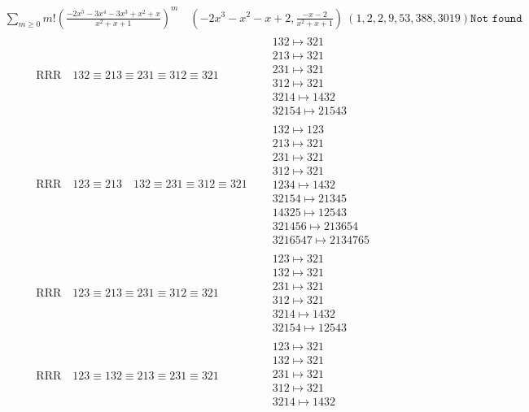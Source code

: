 \documentclass{article}
\begin{document}
$$
\begin{matrix}
\sum_{m \geq 0} m! \left(
\frac{-2 x^{5} - 3 x^{4} - 3 x^{3} + x^{2} + x}{x^{2} + x + 1}
\right)^m
\quad
\left(-2 x^{3} - x^{2} - x + 2, \frac{-x - 2}{x^{2} + x + 1}\right)
\ 
\left(1, 2, 2, 9, 53, 388, 3019\right)
\texttt{
Not found
}
\end{matrix}
$$
\begin{align}
\text{RRR}
\quad
132\equiv213\equiv231\equiv312\equiv321
\quad
&
\begin{matrix}
132 \mapsto 321
\\
213 \mapsto 321
\\
231 \mapsto 321
\\
312 \mapsto 321
\\
3214 \mapsto 1432
\\
32154 \mapsto 21543
\end{matrix}
\\
\text{RRR}
\quad
123\equiv213
\quad
132\equiv231\equiv312\equiv321
\quad
&
\begin{matrix}
132 \mapsto 123
\\
213 \mapsto 321
\\
231 \mapsto 321
\\
312 \mapsto 321
\\
1234 \mapsto 1432
\\
32154 \mapsto 21345
\\
14325 \mapsto 12543
\\
321456 \mapsto 213654
\\
3216547 \mapsto 2134765
\end{matrix}
\\
\text{RRR}
\quad
123\equiv213\equiv231\equiv312\equiv321
\quad
&
\begin{matrix}
123 \mapsto 321
\\
132 \mapsto 321
\\
231 \mapsto 321
\\
312 \mapsto 321
\\
3214 \mapsto 1432
\\
32154 \mapsto 12543
\end{matrix}
\\
\text{RRR}
\quad
123\equiv132\equiv213\equiv231\equiv321
\quad
&
\begin{matrix}
123 \mapsto 321
\\
132 \mapsto 321
\\
231 \mapsto 321
\\
312 \mapsto 321
\\
3214 \mapsto 1432
\\

\end{matrix}
\end{align}
\end{document}
